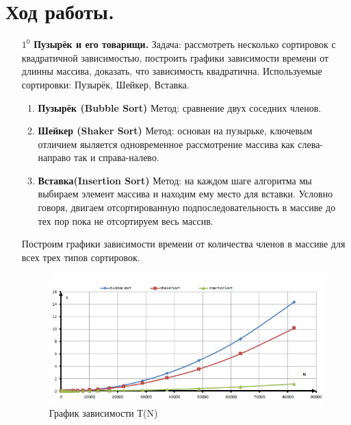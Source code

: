 \documentclass[a4paper, 12pt]{article}
\begin{document}
    \section{Ход работы.}
    \begin{enumerate}
        \item[$1^0$] \textbf{Пузырёк и его товарищи.}
        Задача: рассмотреть несколько сортировок с квадратичной зависимостью, построить графики зависимости времени от длинны массива, доказать, что зависимость квадратична.
        Используемые сортировки: Пузырёк, Шейкер, Вставка.
            \begin{enumerate}
                \item \textbf{Пузырёк (Bubble Sort)} \newline
                Метод: сравнение двух соседних членов.
                \item \textbf{Шейкер (Shaker Sort)} \newline
                Метод: основан на пузырьке, ключевым отличием яыляется одновременное рассмотрение массива как слева-направо так и справа-налево.
                \item \textbf{Вставка(Insertion Sort)} \newline
                Метод: на каждом шаге алгоритма мы выбираем элемент массива и находим ему место для вставки. Условно говоря, двигаем отсортированную подпоследовательность в массиве до тех пор пока не отсортируем весь массив.\newline
            \end{enumerate}
        \newpage
        Построим графики зависимости времени от количества членов в массиве для всех трех типов сортировок. \newline
        \begin{figure}[h!]
            \centering
    		      \includegraphics[scale = 0.8]{1.png}
    		      \caption{График зависимости Т(N)}
    		      \label{fig:my_label}

\end{figure}
\end{enumerate}
\end{document}

